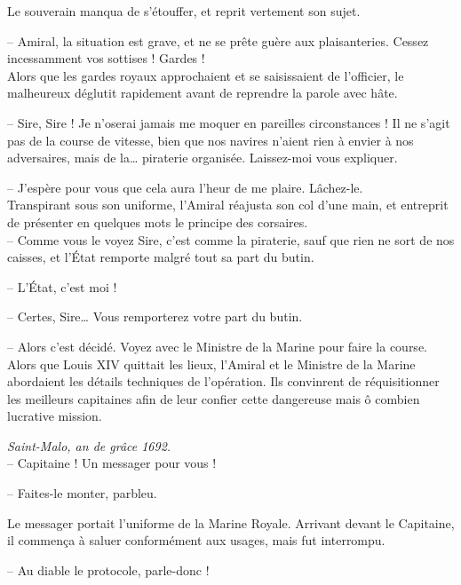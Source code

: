 Le souverain manqua de s'étouffer, et reprit vertement son sujet.

-- Amiral, la situation est grave, et ne se prête guère aux
   plaisanteries. Cessez incessamment vos sottises ! Gardes !\\

Alors que les gardes royaux approchaient et se saisissaient de
l'officier, le malheureux déglutit rapidement avant de reprendre la
parole avec hâte.

-- Sire, Sire ! Je n'oserai jamais me moquer en pareilles
   circonstances ! Il ne s'agit pas de la course de vitesse, bien que
   nos navires n'aient rien à envier à nos adversaires, mais de
   la\ldots{} piraterie organisée. Laissez-moi vous expliquer.

-- J'espère pour vous que cela aura l'heur de me plaire. Lâchez-le.\\

Transpirant sous son uniforme, l'Amiral réajusta son col d'une main,
et entreprit de présenter en quelques mots le principe des
corsaires.\\

-- Comme vous le voyez Sire, c'est comme la piraterie, sauf que rien
   ne sort de nos caisses, et l'État remporte malgré tout sa part du
   butin.

-- L'État, c'est moi !

-- Certes, Sire\ldots{} Vous remporterez votre part du butin.

-- Alors c'est décidé. Voyez avec le Ministre de la Marine pour faire
   la course.\\

Alors que Louis XIV quittait les lieux, l'Amiral et le Ministre de la
Marine abordaient les détails techniques de l'opération. Ils
convinrent de réquisitionner les meilleurs capitaines afin de leur
confier cette dangereuse mais ô combien lucrative mission.

\culdelampe{}

{\selectfont \textit{Saint-Malo, an de grâce 1692.}}\\

-- Capitaine ! Un messager pour vous !

-- Faites-le monter, parbleu.

Le messager portait l'uniforme de la Marine Royale. Arrivant devant le
Capitaine, il commença à saluer conformément aux usages, mais fut
interrompu.

-- Au diable le protocole, parle-donc !

